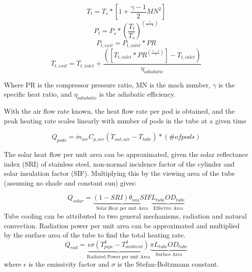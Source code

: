 \documentclass[heading.tex]{subfiles}
\begin{document}
\begin{equation}
T_{t} = T_{s} * [1 + \frac{\gamma -1}{2} MN^2]
\end{equation}
\begin{equation}
P_{t} = P_{s} * (\frac{ T_{t}}{T_{s}})^(\frac{\gamma}{\gamma -1})
\end{equation}
\begin{equation}
P_{t,exit} = P_{t,inlet} * PR
\end{equation}
\begin{equation}
T_{t,exit} = T_{t,inlet} + \frac{([T_{t,inlet}*PR^{(\frac{\gamma-1}{\gamma})}] - T_{t,inlet})}  {{\eta}_{adiabatic}}
\end{equation}

Where PR is the compressor pressure ratio, MN is the mach number,  $\gamma$ is the specific heat ratio, and  ${\eta}_{adiabatic}$ is the
adiabatic efficiency.

With the air flow rate known, the heat flow rate per pod is obtained, 
and the peak heating rate scales linearly with number of pods in the tube at a given time

\begin{equation}
{Q}_{pods}= \dot{m}_{air} C_{p,air} (T_{out, air} - T_{tube}) * (\#  of pods)
\end{equation}

The solar heat flow per unit area can be approximated, given the solar reflectance index (SRI) of stainless steel, non-normal incidence factor
of the cylinder and solar insulation factor (SIF).
Multiplying this by the viewing area of the tube (assuming no shade and constant sun) gives:


\begin{equation}
Q_{solar} = \underbrace{ (1-SRI)  {\theta}_{nni}  SIF}_\text{Solar Heat per unit Area} \underbrace{L_{tube}  OD_{tube}}_\text{Effective Area}
\end{equation}
Tube cooling can be attributed to two general mechanisms, radiation and natural convection. Radiation power per unit area can be
approximated and multiplied by the surface area of the tube to find the total heating rate.
\begin{equation}
Q_{rad} = \underbrace{\epsilon \sigma (T_{pipe}^4 - T_{ambient}^4)}_\text{Radiated Power per unit Area}\underbrace{\pi L_{tube} OD_{tube}}_\text{Surface Area}
\end{equation}
where  $\epsilon$ is the emissivity factor and  $\sigma$ is the Stefan-Boltzmann constant.
\end{document}
